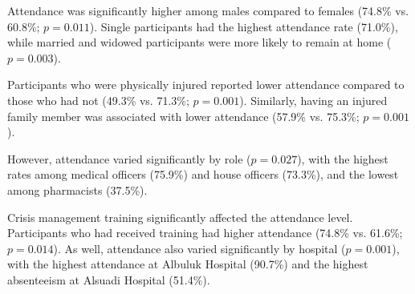 \documentclass[12pt]{article}
\begin{document}
Attendance was significantly higher among males compared to females (74.8\% vs. 60.8\%; $p = 0.011$). Single participants had the highest attendance rate (71.0\%), while married and widowed participants were more likely to remain at home ($p = 0.003$).

Participants who were physically injured reported lower attendance compared to those who had not (49.3\% vs. 71.3\%; $p = 0.001$). Similarly, having an injured family member was associated with lower attendance (57.9\% vs. 75.3\%; $p = 0.001$).

However, attendance varied significantly by role ($p = 0.027$), with the highest rates among medical officers (75.9\%) and house officers (73.3\%), and the lowest among pharmacists (37.5\%).

Crisis management training significantly affected the attendance level. Participants who had received training had higher attendance (74.8\% vs. 61.6\%; $p = 0.014$). As well, attendance also varied significantly by hospital ($p = 0.001$), with the highest attendance at Albuluk Hospital (90.7\%) and the highest absenteeism at Alsuadi Hospital (51.4\%).
\end{document}
